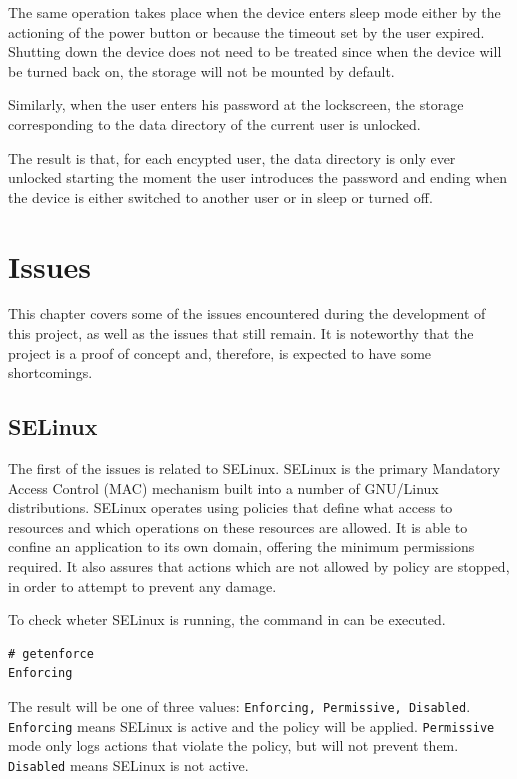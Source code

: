 The same operation takes place when the device enters sleep mode either by the actioning of the power button or because the timeout set by the user expired. Shutting down the device does not need to be treated since when the device will be turned back on, the storage will not be mounted by default.

Similarly, when the user enters his password at the lockscreen, the storage corresponding to the data directory of the current user is unlocked.

The result is that, for each encypted user, the data directory is only ever unlocked starting the moment the user introduces the password and ending when the device is either switched to another user or in sleep or turned off.

\section{Issues}
\label{sec:issues-multi-user}

This chapter covers some of the issues encountered during the development of this project, as well as the issues that still remain. It is noteworthy that the project is a proof of concept and, therefore, is expected to have some shortcomings.

\subsection{SELinux}
\label{sub-sec:selinux-multi-user}

The first of the issues is related to SELinux. SELinux is the primary Mandatory Access Control (MAC) mechanism built into a number of GNU/Linux distributions. SELinux operates using policies that define what access to resources and which operations on these resources are allowed. It is able to confine an application to its own domain, offering the minimum permissions required. It also assures that actions which are not allowed by policy are stopped, in order to attempt to prevent any damage.

To check wheter SELinux is running, the command in  can be executed.

\begin{lstlisting}[numbers=none, caption=Checking SELinux status, label=lst:selinux-multi-user]
# getenforce
Enforcing
\end{lstlisting}
The result will be one of three values: \texttt{Enforcing, Permissive, Disabled}. \texttt{Enforcing} means SELinux is active and the policy will be applied. \texttt{Permissive} mode only logs actions that violate the policy, but will not prevent them. \texttt{Disabled} means SELinux is not active.

